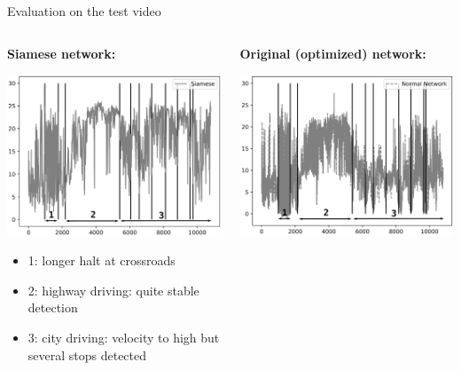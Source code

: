 \begin{frame}{Evaluation on the test video}
	\begin{columns}[c]
		\begin{column}{0.5\textwidth}
			\textbf{Siamese network:}
			\begin{center}
				\includegraphics[width=\textwidth]{imgs/siamese_testvideo.eps}
			\end{center}
			\vspace{-0.5cm}
			\begin{itemize}
				\item 1: longer halt at crossroads
				\item 2: highway driving: quite stable detection
				\item 3: city driving: velocity to high but several stops detected
			\end{itemize}
		\end{column}
		\begin{column}{0.5\textwidth}
			\textbf{Original (optimized) network:}
			\begin{center}
				\includegraphics[width=\textwidth]{imgs/normal_testvideo.eps}

\end{center}
\end{column}
\end{columns}
\end{frame}
